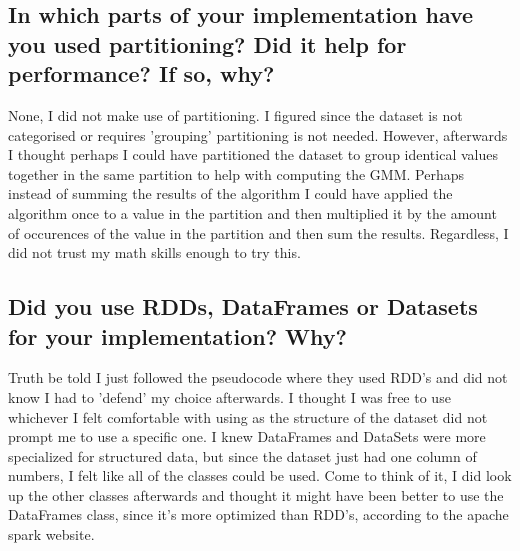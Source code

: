 \documentclass{article}
\begin{document}
\subsection{
	In which parts of your implementation have you used partitioning? Did it help for
	performance? If so, why?
}
None, I did not make use of partitioning.
I figured since the dataset is not categorised or requires 'grouping' partitioning is not needed.
However, afterwards I thought perhaps I could have partitioned the dataset to group identical values together in the same partition to help with computing the GMM.
Perhaps instead of summing the results of the algorithm I could have applied the algorithm once to a value in the partition and then multiplied it by the amount of occurences of the value in the partition and then sum the results. Regardless, I did not trust my math skills enough to try this.
\subsection{
	Did you use RDDs, DataFrames or Datasets for your implementation? Why?
}
Truth be told I just followed the pseudocode where they used RDD's and did not know I had to 'defend' my choice afterwards. I thought I was free to use whichever I felt comfortable with using as the structure of the dataset did not prompt me to use a specific one.
I knew DataFrames and DataSets were more specialized for structured data, but since the dataset just had one column of numbers, I felt like all of the classes could be used.
Come to think of it, I did look up the other classes afterwards and thought it might have been better to use the DataFrames class, since it's more optimized than RDD's, according to the apache spark website.
\end{document}
